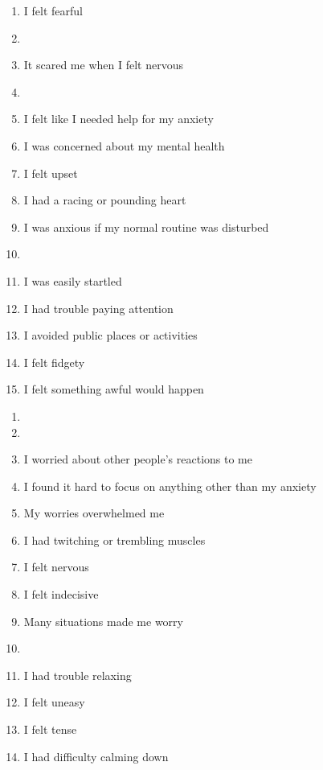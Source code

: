 \begin{minipage}{0.45\textwidth}\scriptsize
\begin{enumerate}
\item I felt fearful
\item {}
\item It scared me when I felt nervous
\item {}
\item I felt like I needed help for my anxiety
\item I was concerned about my mental health
\item I felt upset
\item I had a racing or pounding heart
\item I was anxious if my normal routine was disturbed
\item {}
\item I was easily startled
\item I had trouble paying attention
\item I avoided public places or activities
\item I felt fidgety
\item I felt something awful would happen
\setcounter{enumTemp}{\theenumi}
\end{enumerate}
\end{minipage}\hfill
\begin{minipage}{0.45\textwidth}\scriptsize
\begin{enumerate}
\setcounter{enumi}{\theenumTemp}
\item {}
\item {}
\item I worried about other people's reactions to me
\item I found it hard to focus on anything other than my anxiety
\item My worries overwhelmed me
\item I had twitching or trembling muscles
\item I felt nervous
\item I felt indecisive
\item Many situations made me worry
\item {}
\item I had trouble relaxing
\item I felt uneasy
\item I felt tense
\item I had difficulty calming down
\end{enumerate}
\end{minipage}

